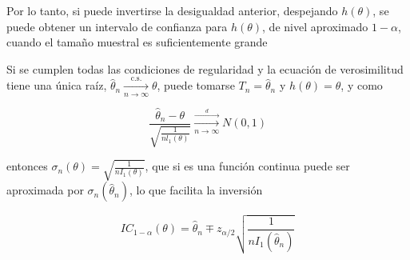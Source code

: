Por lo tanto, si puede invertirse la desigualdad anterior, despejando
$h(\theta)$, se puede obtener un intervalo de confianza para $h(\theta)$, de
nivel aproximado $1-\alpha$, cuando el tamaño muestral es suficientemente
grande

\begin{observación}
Si se cumplen todas las condiciones de regularidad y la ecuación de verosimilitud tiene una única raíz, $\hat{\theta}_{n} \xrightarrow[n \rightarrow \infty]{\text { c.s. }} \theta$, puede tomarse $T_{n}=\hat{\theta}_{n}$ y $h(\theta)=\theta$, y como

$$
    \frac{\hat{\theta}_{n}-\theta}{\sqrt{\frac{1}{n l_{1}(\theta)}}} \xrightarrow[n \rightarrow \infty]{\stackrel{d}{\longrightarrow}} N(0,1)
$$

entonces $\sigma_{n}(\theta)=\sqrt{\frac{1}{n I_{1}(\theta)}}$, que si es una
función continua puede ser aproximada por
$\sigma_{n}\left(\hat{\theta}_{n}\right)$, lo que facilita la inversión

$$
    I C_{1-\alpha}(\theta)=\hat{\theta}_{n} \mp z_{\alpha / 2} \sqrt{\frac{1}{n I_{1}\left(\hat{\theta}_{n}\right)}}
$$
\end{observación}


